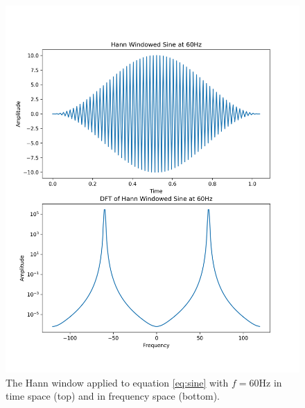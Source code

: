\documentclass[11pt, letterpage]{article}
\begin{document}
\begin{figure}
  \includegraphics[width=\linewidth]{hann_0.png}
  \caption{
    The Hann window applied to equation \ref{eq:sine} with $f = 60$Hz in time
    space (top) and in frequency space (bottom).
  }
  \label{fig:hann_0}
\end{figure}
\end{document}

